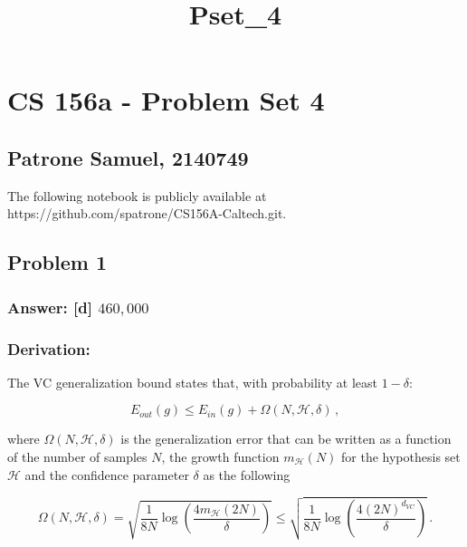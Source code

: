\documentclass[11pt]{article}
\title{Pset\_4}
\begin{document}
    
    \maketitle
    
    

    
    \hypertarget{cs-156a---problem-set-4}{%
\section{CS 156a - Problem Set 4}\label{cs-156a---problem-set-4}}

\hypertarget{patrone-samuel-2140749}{%
\subsection{Patrone Samuel, 2140749}\label{patrone-samuel-2140749}}

The following notebook is publicly available at
https://github.com/spatrone/CS156A-Caltech.git.

    \hypertarget{problem-1}{%
\subsection{Problem 1}\label{problem-1}}

\hypertarget{answer-d-460000}{%
\subsubsection{\texorpdfstring{Answer: {[}d{]}
\(460,000\)}{Answer: {[}d{]} 460,000}}\label{answer-d-460000}}

\hypertarget{derivation}{%
\subsubsection{Derivation:}\label{derivation}}

The VC generalization bound states that, with probability at least
\(1-\delta\):

\[
E_{out}(g)\le E_{in}(g) + \Omega(N,\mathcal{H},\delta)\,,
\]

where \(\Omega(N,\mathcal{H},\delta)\) is the generalization error that
can be written as a function of the number of samples \(N\), the growth
function \(m_{\mathcal{H}}(N)\) for the hypothesis set \(\mathcal{H}\)
and the confidence parameter \(\delta\) as the following

\[
\Omega(N,\mathcal{H},\delta)=\sqrt{\frac{1}{8N}\log{\left(\frac{4 m_{\mathcal{H}}(2N)}{\delta}\right)}}\le \sqrt{\frac{1}{8N}\log{\left(\frac{4 (2N)^{d_{VC}}}{\delta}\right)}}\,.
\]
\end{document}
